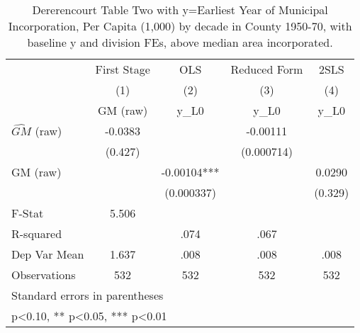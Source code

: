\begin{table}[htbp]\centering
\def\sym#1{\ifmmode^{#1}\else\(^{#1}\)\fi}
\caption{Dererencourt Table Two with y=Earliest Year of Municipal Incorporation, Per Capita (1,000) by decade in County 1950-70, with baseline y and division FEs, above median area incorporated.}
\begin{tabular}{l*{4}{c}}
\toprule
                    & First Stage   &         OLS   &Reduced Form   &        2SLS   \\
                    &\multicolumn{1}{c}{(1)}&\multicolumn{1}{c}{(2)}&\multicolumn{1}{c}{(3)}&\multicolumn{1}{c}{(4)}\\
                    &\multicolumn{1}{c}{GM  (raw)}&\multicolumn{1}{c}{y\_L0}&\multicolumn{1}{c}{y\_L0}&\multicolumn{1}{c}{y\_L0}\\
\midrule
$\hat{GM}$ (raw)    &     -0.0383   &               &    -0.00111   &               \\
                    &     (0.427)   &               &  (0.000714)   &               \\
\addlinespace
GM  (raw)           &               &    -0.00104***&               &      0.0290   \\
                    &               &  (0.000337)   &               &     (0.329)   \\
\midrule
F-Stat              &       5.506   &               &               &               \\
R-squared           &               &        .074   &        .067   &               \\
Dep Var Mean        &       1.637   &        .008   &        .008   &        .008   \\
Observations        &         532   &         532   &         532   &         532   \\
\bottomrule
\multicolumn{5}{l}{\footnotesize Standard errors in parentheses}\\
\multicolumn{5}{l}{\footnotesize * p<0.10, ** p<0.05, *** p<0.01}\\
\end{tabular}
\end{table}
